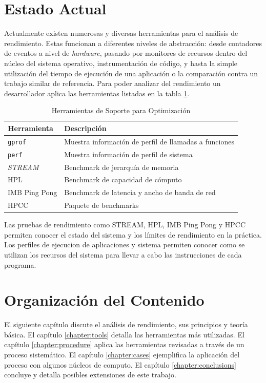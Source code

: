 \documentclass[a4paper]{report}
\begin{document}
\section{Estado Actual}

Actualmente existen numerosas y diversas herramientas para el análisis de rendimiento.
Estas funcionan a diferentes niveles de abstracción: desde contadores de eventos
a nivel de {\it hardware}, pasando por monitores de recursos dentro del núcleo del sistema operativo, instrumentación de código, y hasta la simple utilización del tiempo de ejecución de una aplicación o la comparación contra un trabajo similar de referencia.
Para poder analizar del rendimiento un desarrollador aplica las herramientas listadas en la tabla \ref{table:tools}.

\begin{table}[H]
    \caption{Herramientas de Soporte para Optimización}
    \centering
    \begin{tabular}{|l|l|}\hline
      {\bf Herramienta} & {\bf Descripción} \\ \hline
      {\tt gprof} & Muestra información de perfil de llamadas a funciones \\ \hline
      {\tt perf} & Muestra información de perfil de sistema \\ \hline
      {\it STREAM} & Benchmark de jerarquía de memoria \\ \hline
      HPL & Benchmark de capacidad de cómputo \\ \hline
      IMB Ping Pong & Benchmark de latencia y ancho de banda de red \\ \hline
      HPCC & Paquete de benchmarks \\ \hline
    \end{tabular}
    \label{table:tools}
\end{table}

Las pruebas de rendimiento como STREAM, HPL, IMB Ping Pong y HPCC permiten conocer el estado del sistema y los límites de rendimiento en la práctica.
Los perfiles de ejecucion de aplicaciones y sistema permiten conocer como se utilizan los recursos del sistema para llevar a cabo las instrucciones de cada programa.

\section{Organización del Contenido}

El siguiente capítulo discute el análisis de rendimiento, sus
principios y teoría básica. El capítulo \ref{chapter:tools} detalla las herramientas más
utilizadas. El capítulo \ref{chapter:procedure} aplica las herramientas revisadas a través de un proceso sistemático. El capítulo \ref{chapter:cases} ejemplifica la aplicación del proceso con algunos núcleos de computo. El capítulo \ref{chapter:conclusions} concluye y detalla posibles extensiones de este trabajo.
\end{document}
